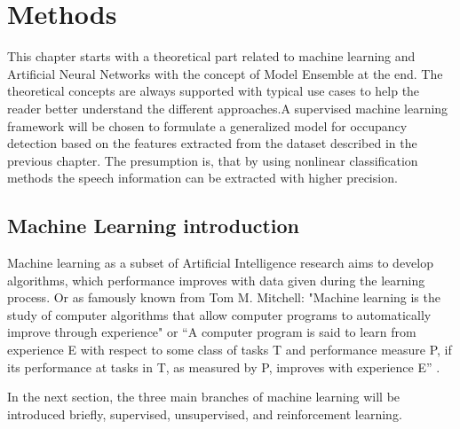 \chapter{Methods}
\label{chapter:methods}




This chapter starts with a theoretical part related to machine learning and Artificial Neural Networks with the concept of Model Ensemble at the end. The theoretical concepts are always supported with typical use cases to help the reader better understand the different approaches.A supervised machine learning framework will be chosen to formulate a generalized model for occupancy detection based on the features extracted from the dataset described in the previous chapter. The presumption is, that by using nonlinear classification methods the speech information can be extracted with higher precision.


\section{Machine Learning introduction}

Machine learning as a subset of Artificial Intelligence research aims to develop algorithms, which performance improves with data given during the learning process. Or as famously known from Tom M. Mitchell: "Machine learning is the study of computer algorithms that allow computer programs to automatically improve through experience" or “A computer program is said to learn from experience E with respect to some class of tasks T and performance measure P, if its performance at tasks in T, as measured by P, improves with experience E” \cite{ML_book_Mitchell97}.

In the next section, the three main branches of machine learning will be introduced briefly, supervised, unsupervised, and reinforcement learning. 


